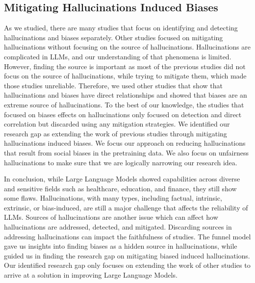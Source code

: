 \documentclass[twocolumn]{article}
\begin{document}
\subsection{Mitigating Hallucinations Induced Biases}
As we studied, there are many studies that focus on identifying and detecting hallucinations and biases separately. Other studies focused on mitigating hallucinations without focusing on the source of hallucinations. Hallucinations are complicated in LLMs, and our understanding of that phenomena is limited. However, finding the source is important as most of the previous studies did not focus on the source of hallucinations, while trying to mitigate them, which made those studies unreliable. Therefore, we used other studies that show that hallucinations and biases have direct relationships and showed that biases are an extreme source of hallucinations. To the best of our knowledge, the studies that focused on biases effects on hallucinations only focused on detection and direct correlation but discarded using any mitigation strategies. We identified our research gap as extending the work of previous studies through mitigating hallucinations induced biases. We focus our approach on reducing hallucinations that result from social biases in the pretraining data. We also focus on unfairness hallucinations to make sure that we are logically narrowing our research idea. 

In conclusion, while Large Language Models showed capabilities across diverse and sensitive fields such as healthcare, education, and finance, they still show some flaws. Hallucinations, with many types, including factual, intrinsic, extrinsic, or bias-induced, are still a major challenge that affects the reliability of LLMs. Sources of hallucinations are another issue which can affect how hallucinations are addressed, detected, and mitigated. Discarding sources in addressing hallucinations can impact the faithfulness of studies. The funnel model gave us insights into finding biases as a hidden source in hallucinations, while guided us in finding the research gap on mitigating biased induced hallucinations. Our identified research gap only focuses on extending the work of other studies to arrive at a solution in improving Large Language Models.    


\printbibliography
\end{document}
